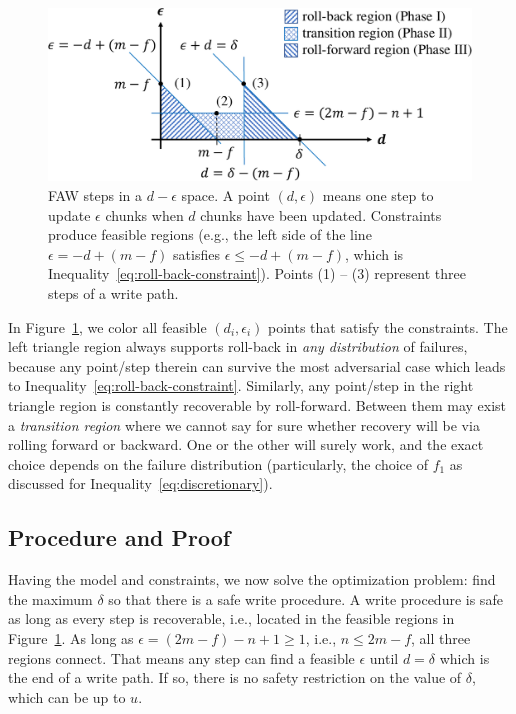 \documentclass[letterpaper,10pt,twocolumn]{article}
\def\protocol/{FAW}
\begin{document}
\begin{figure}[!t]
  \centering
  \includegraphics[width=\linewidth]{figures/d-e-space}
  \caption{\protocol/ steps in a $d-\epsilon$ space. A point $(d, \epsilon)$
means one step to update $\epsilon$ chunks when $d$ chunks have been updated.
Constraints produce feasible regions (e.g., the left side of the line $\epsilon
= -d + (m - f)$ satisfies $\epsilon \le -d + (m - f)$, which is
Inequality~\ref{eq:roll-back-constraint}). Points (1) -- (3) represent three
steps of a write path. \vspace{-1em}}
  \label{fig:d-e-space}
\end{figure}

In Figure~\ref{fig:d-e-space}, we color all feasible $(d_i, \epsilon_i)$ points
that satisfy the constraints. The left triangle region always supports
roll-back in \emph{any distribution} of failures, because any point/step
therein can survive the most adversarial case which leads to
Inequality~\ref{eq:roll-back-constraint}. Similarly, any point/step in the right triangle region is
constantly recoverable by roll-forward. Between them may exist a
\emph{transition region} where we cannot say for sure whether recovery will be via rolling forward or backward. 
One or the other will surely work, and the exact choice depends on the failure distribution (particularly, the choice of $f_1$ as
discussed for Inequality~\ref{eq:discretionary}).

\subsection{Procedure and Proof}

Having the model and constraints, we now solve the optimization problem: find the
maximum $\delta$ so that there is a safe write procedure.  A write procedure is
safe as long as every step is recoverable, i.e., located in the
feasible regions in Figure~\ref{fig:d-e-space}.  As long as $\epsilon = (2m -
f) - n + 1 \ge 1$, i.e., $n \le 2m - f$, all three regions connect. That means
any step can find a feasible $\epsilon$ until $d = \delta$ which is the end of
a write path. If so, there is no safety restriction on the value of $\delta$,
which can be up to $u$.
\end{document}
